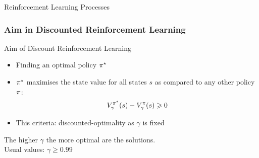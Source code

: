\documentclass[xcolor=table%
,t]{beamer}
\begin{document}
\begin{frame}[t]
\begin{block}{Reinforcement Learning Processes~\footnotemark}
\begin{itemize}
    \end{itemize}
  \end{block}


\end{frame}


\begin{frame}[t]
  \frametitle{Aim in Discounted Reinforcement Learning}

  \begin{block}{Aim of Discount Reinforcement Learning}
    \begin{itemize}
    \item Finding an optimal policy \(\pi^{\star}\)
    \item \(\pi^{\star}\) maximises the state value for all states \(s\) as compared to any other policy
      \(\pi\):
      \begin{align*}
        V_{\gamma}^{\pi^{\star}}(s) - V_{\gamma}^{\pi}(s) \geqslant 0
      \end{align*}
      \pause{}
    \item This criteria: discounted-optimality %
      as \(\gamma\) is \alert{fixed}
    \end{itemize}
  \end{block}\pause

  \begin{block}{}
    \centering
    \alert{The higher \(\gamma\) the more optimal are the solutions.}\\[1.5ex] \pause
    Usual values: \(\gamma \geqslant  0.99\)
  \end{block}
\end{frame}
\end{document}
